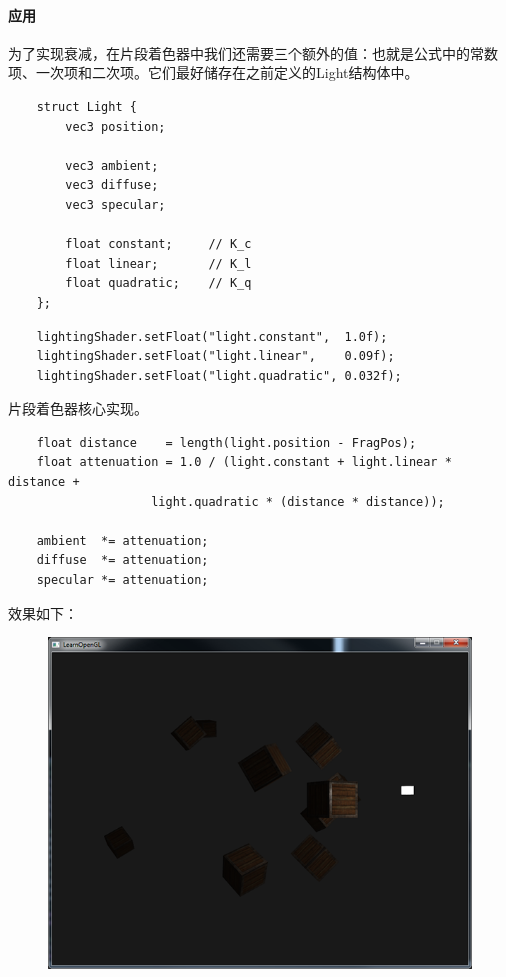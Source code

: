 \documentclass[UTF8,a4paper,12pt]{ctexbook}
\begin{document}
			\paragraph{应用}
				为了实现衰减，在片段着色器中我们还需要三个额外的值：也就是公式中的常数项、一次项和二次项。它们最好储存在之前定义的Light结构体中。
				
				\begin{lstlisting}
	struct Light {
	    vec3 position;  
	
	    vec3 ambient;
	    vec3 diffuse;
	    vec3 specular;
	
	    float constant;		// K_c
	    float linear;		// K_l
	    float quadratic;	// K_q
	};				
				\end{lstlisting}
				
				\begin{lstlisting}
	lightingShader.setFloat("light.constant",  1.0f);
	lightingShader.setFloat("light.linear",    0.09f);
	lightingShader.setFloat("light.quadratic", 0.032f);				
				\end{lstlisting}
				
				
				片段着色器核心实现。
				\begin{lstlisting}
	float distance    = length(light.position - FragPos);
	float attenuation = 1.0 / (light.constant + light.linear * distance + 
	                light.quadratic * (distance * distance));	
	                
	ambient  *= attenuation; 
	diffuse  *= attenuation;
	specular *= attenuation;	          			
				\end{lstlisting}
			
				效果如下：
				\begin{figure}[H]
					\centering
					\includegraphics[width=.7\linewidth]{light_casters_point_light}
				\end{figure}
			
\end{document}
